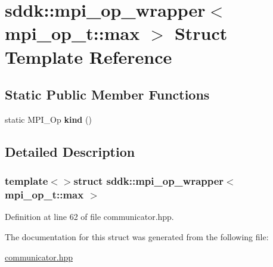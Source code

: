 \hypertarget{structsddk_1_1mpi__op__wrapper_3_01mpi__op__t_1_1max_01_4}{}\section{sddk\+:\+:mpi\+\_\+op\+\_\+wrapper$<$ mpi\+\_\+op\+\_\+t\+:\+:max $>$ Struct Template Reference}
\label{structsddk_1_1mpi__op__wrapper_3_01mpi__op__t_1_1max_01_4}
\subsection*{Static Public Member Functions}
\begin{DoxyCompactItemize}
\item 
\hypertarget{structsddk_1_1mpi__op__wrapper_3_01mpi__op__t_1_1max_01_4_aec91851baab63d602eb68d6b486f4ea2}{}static M\+P\+I\+\_\+\+Op {\bfseries kind} ()\label{structsddk_1_1mpi__op__wrapper_3_01mpi__op__t_1_1max_01_4_aec91851baab63d602eb68d6b486f4ea2}

\end{DoxyCompactItemize}


\subsection{Detailed Description}
\subsubsection*{template$<$$>$struct sddk\+::mpi\+\_\+op\+\_\+wrapper$<$ mpi\+\_\+op\+\_\+t\+::max $>$}



Definition at line 62 of file communicator.\+hpp.



The documentation for this struct was generated from the following file\+:\begin{DoxyCompactItemize}
\item 
\hyperlink{communicator_8hpp}{communicator.\+hpp}\end{DoxyCompactItemize}
